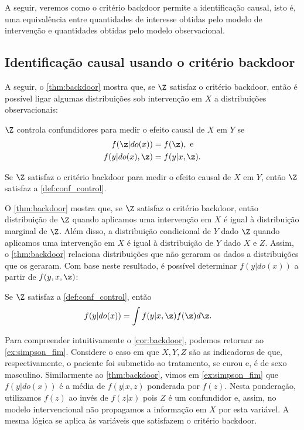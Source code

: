A seguir, veremos como o critério backdoor permite
a identificação causal, isto é,
uma equivalência entre quantidades de interesse
obtidas pelo modelo de intervenção e
quantidades obtidas pelo modelo observacional.

\subsection{Identificação causal usando o critério backdoor}

A seguir, o \cref{thm:backdoor} mostra que,
se $\Z$ satisfaz o critério backdoor, então
é possível ligar algumas 
distribuições sob intervenção em $X$ a
distribuições observacionais:

\begin{definition}
 \label{def:conf_control}
 $\Z$ controla confundidores para
 medir o efeito causal de $X$ em $Y$ se
 \begin{align*}
  f(\z|do(x)) 
  &= f(\z), \text{ e } \\
  f(y|do(x), \z) 
  &= f(y|x, \z).
 \end{align*}
\end{definition}

\begin{theorem}
 \label{thm:backdoor}
 Se $\Z$ satisfaz 
 o critério backdoor para medir
 o efeito causal de $X$ em $Y$, então
 $\Z$ satisfaz a \cref{def:conf_control}.
\end{theorem}

O \cref{thm:backdoor} mostra que,
se $\Z$ satisfaz o critério backdoor, então
distribuição de $\Z$ quando
aplicamos uma intervenção em $X$ é igual
à distribuição marginal de $\Z$.
Além disso, a distribuição condicional de
$Y$ dado $\Z$ quando aplicamos uma intervenção em $X$ é igual 
à distribuição de $Y$ dado $X$ e $Z$.
Assim, o \cref{thm:backdoor} relaciona
distribuições que não geraram os dados a 
distribuições que os geraram.
Com base neste resultado, é possível determinar
$f(y|do(x))$ a partir de $f(y,x,\z)$:

\begin{corollary}
 \label{cor:backdoor}
 Se $\Z$ satisfaz
 a \cref{def:conf_control}, então
 \begin{align*}
  f(y|do(x)) &=
  \int f(y|x,\z)f(\z)d\z.
 \end{align*}
\end{corollary}

Para compreender intuitivamente o \cref{cor:backdoor},
podemos retornar ao \cref{ex:simpson_fim}.
Considere o caso em que $X, Y, Z$ são as indicadoras de que,
respectivamente, o paciente foi submetido ao tratamento,
se curou e, é de sexo masculino.
Similarmente ao \cref{thm:backdoor},
vimos em \cref{ex:simpson_fim} que $f(y|do(x))$ é
a média de $f(y|x,z)$ ponderada por $f(z)$.
Nesta ponderação, utilizamos $f(z)$ 
ao invés de $f(z|x)$ pois $Z$ é um confundidor e,
assim, no modelo intervencional não propagamos
a informação em $X$ por esta variável.
A mesma lógica se aplica 
às variáveis que satisfazem o critério backdoor.

